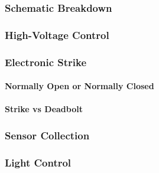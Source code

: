 \subsubsection{Schematic Breakdown}

\subsubsection{High-Voltage Control}

\subsubsection{Electronic Strike}

\paragraph{Normally Open or Normally Closed}

\paragraph{Strike vs Deadbolt}

\subsubsection{Sensor Collection}

\subsubsection{Light Control}

